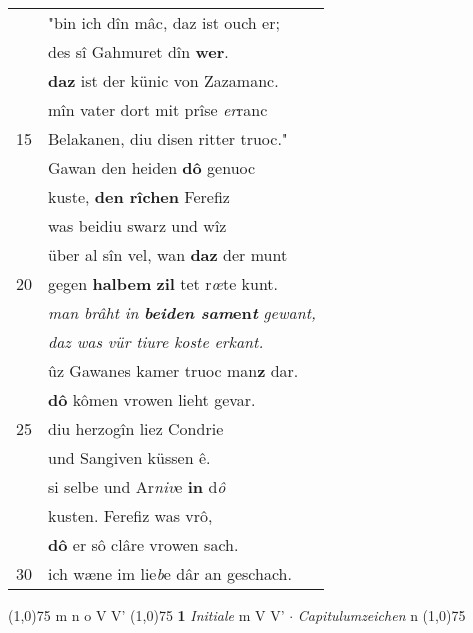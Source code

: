 \documentclass[8pt,a4paper,notitlepage]{article}
\begin{document}
\begin{table}[ht]
\begin{minipage}[t]{0.5\linewidth}
\begin{tabular}{rl}
 & "bin ich dîn mâc, daz ist ouch er;\\ 
 & des sî Gahmuret dîn \textbf{wer}.\\ 
 & \textbf{daz} ist der künic von Zazamanc.\\ 
 & mîn vater dort mit prîse \textit{er}ranc\\ 
15 & Belakanen, diu disen ritter truoc."\\ 
 & Gawan den heiden \textbf{dô} genuoc\\ 
 & kuste, \textbf{den rîchen} Ferefiz\\ 
 & was beidiu swarz und wîz\\ 
 & über al sîn vel, wan \textbf{daz} der munt\\ 
20 & gegen \textbf{halbem} \textbf{zil} tet r\textit{œ}te kunt.\\ 
 & \textit{man brâht in} \textbf{\textit{beiden sam}en\textit{t}} \textit{gewant,}\\ 
 & \textit{daz was vür tiure koste erkant.}\\ 
 & ûz Gawanes kamer truoc man\textbf{z} dar.\\ 
 & \textbf{dô} kômen vrowen lieht gevar.\\ 
25 & diu herzogîn liez Condrie\\ 
 & und Sangiven küssen ê.\\ 
 & si selbe und Ar\textit{niv}e \textbf{in} d\textit{ô}\\ 
 & kusten. Ferefiz was vrô,\\ 
 & \textbf{dô} er sô clâre vrowen sach.\\ 
30 & ich wæne im lie\textit{b}e dâr an geschach.\\ 
\end{tabular}
\scriptsize
\line(1,0){75} \newline
m n o V V' \newline
\line(1,0){75} \newline
\textbf{1} \textit{Initiale} m V V'   $\cdot$ \textit{Capitulumzeichen} n  \newline
\line(1,0){75} \newline

\end{minipage}
\end{table}
\end{document}
